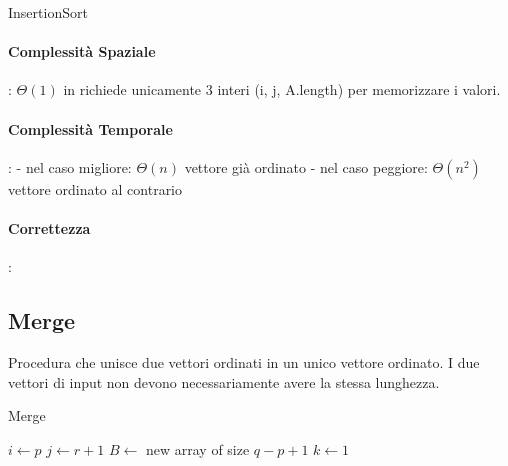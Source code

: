 \documentclass{article}
\begin{document}
    \begin{algorithm}[H] 
        \caption{InsertionSort\label{IR}}
        \end{algorithm}

\paragraph{Complessità Spaziale}: $\Theta(1)$ in richiede unicamente 3 interi (i, j, A.length) 
per memorizzare i valori.

\paragraph{Complessità Temporale}: \newline
- nel caso migliore: $\Theta(n)$ vettore già ordinato \newline
- nel caso peggiore: $\Theta(n^2)$ vettore ordinato al contrario 

\paragraph{Correttezza}:

\newpage

\subsection{Merge} %
Procedura che unisce due vettori ordinati in un unico vettore ordinato. I due vettori di input non devono necessariamente avere la stessa lunghezza. 

\begin{algorithm}[H]
\caption{Merge}
$i \leftarrow p$\;
$j \leftarrow r + 1$\;
$B \leftarrow$ new array of size $q - p + 1$\;
$k \leftarrow 1$\;
\end{algorithm}
\end{document}
